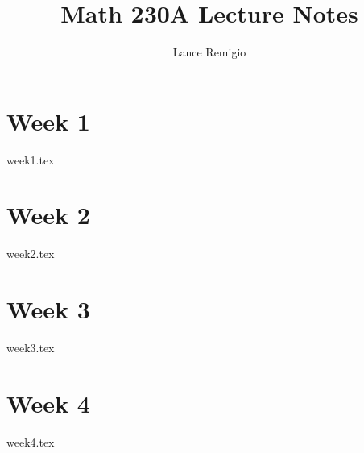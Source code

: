 \documentclass[a4paper]{report}
\title{Math 230A Lecture Notes}
\author{Lance Remigio}
\begin{document}
\maketitle 
\tableofcontents

\rhead{\thepage}

\chapter{Week 1}

{week1.tex}

\chapter{Week 2}

{week2.tex}

\chapter{Week 3}

{week3.tex}

\chapter{Week 4}

{week4.tex}
\end{document}
